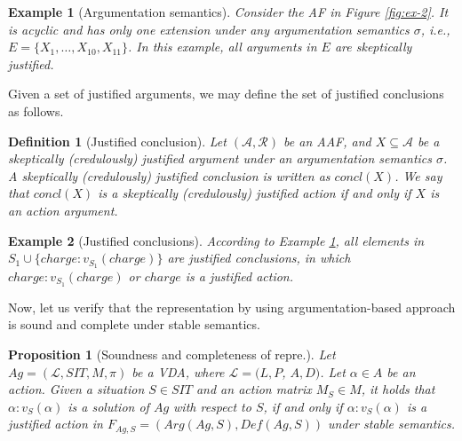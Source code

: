 \documentclass[letterpaper]{article} %
\newtheorem{definition}{Definition}
\newtheorem{example}{Example}
\newtheorem{proposition}{Proposition}
\begin{document}
\begin{example}[Argumentation semantics] \label{ex-argsem}
Consider the AF in Figure \ref{fig:ex-2}. It is acyclic and has only one extension under any argumentation semantics $\sigma$, i.e., $E = \{X_1, \dots, X_{10}, X_{11}\}$. In this example, all arguments in $E$ are skeptically justified.
\end{example}

Given a set of justified arguments, we may define the set of justified conclusions as follows. 

\begin{definition}[Justified conclusion]
Let $(\mathcal{A}, \mathcal{R})$ be an AAF, and $X\subseteq \mathcal{A}$ be a skeptically (credulously) justified argument under an argumentation semantics $\sigma$. A skeptically (credulously) justified conclusion is written as $concl(X)$. We say that $concl(X)$ is a skeptically (credulously) justified action if and only if $X$ is an action argument.
\end{definition}

\begin{example}[Justified conclusions] \label{ex-just}
According to Example \ref{ex-argsem}, all elements in $S_1\cup \{charge: v_{S_1}(charge)\}$ are justified conclusions, in which $charge: v_{S_1}(charge)$ or $charge$ is a justified action.
\end{example}

Now, let us verify that the representation by using argumentation-based approach is sound and complete under stable semantics. 

\begin{proposition}[Soundness and completeness of repre.]
Let $Ag = (\mathcal{L}, SIT, M, \pi)$ be a VDA, where $\mathcal{L} = (L, P$, $A, D)$. Let $\alpha\in A$ be an action. Given a situation $S\in SIT$ and an action matrix $M_S\in M$, it holds that $\alpha : v_{S}(\alpha)$ is a solution of $Ag$ with respect to $S$, if and only if $\alpha : v_{S}(\alpha)$ is a justified action in $F_{Ag, S} = (Arg(Ag, S), Def(Ag, S))$ under stable semantics.
\end{proposition}
\end{document}
